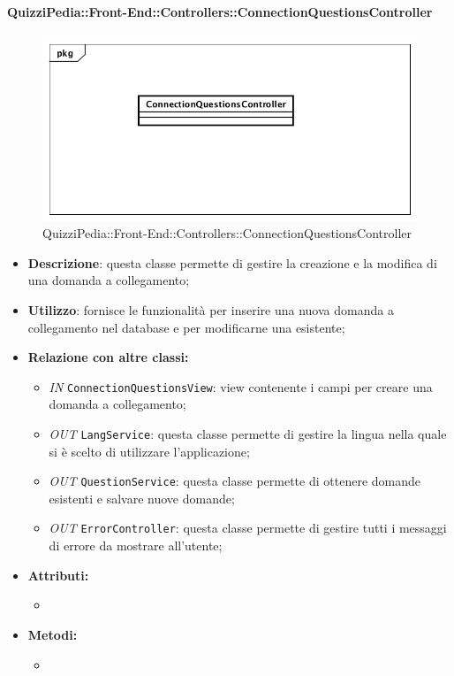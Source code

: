 \paragraph{QuizziPedia::Front-End::Controllers::ConnectionQuestionsController}
\begin{figure}
	\centering
	\includegraphics[scale=0.45]{UML/Classi/Front-End/QuizziPedia_Front-end_Controller_ConnectionQuestionsController.png}
	\caption{QuizziPedia::Front-End::Controllers::ConnectionQuestionsController}
\end{figure}
\begin{itemize}
	\item \textbf{Descrizione}: questa classe permette di gestire la creazione e la modifica di una domanda a collegamento;
	\item \textbf{Utilizzo}: fornisce le funzionalità per inserire una nuova domanda a collegamento nel database e per modificarne una esistente;
	\item \textbf{Relazione con altre classi:}
	\begin{itemize}
		\item \textit{IN} \texttt{ConnectionQuestionsView}: view contenente i campi per creare una domanda a collegamento;  
		\item \textit{OUT} \texttt{LangService}: questa classe permette di gestire la lingua nella quale si è scelto di utilizzare l'applicazione;
		\item \textit{OUT} \texttt{QuestionService}: questa classe permette di ottenere domande esistenti e salvare nuove domande;
		\item \textit{OUT} \texttt{ErrorController}: questa classe permette di gestire tutti i messaggi di errore da mostrare all'utente;
	\end{itemize}
	\item \textbf{Attributi:}
	\begin{itemize}
		\item 
	\end{itemize}
	\item \textbf{Metodi:}
	\begin{itemize}
		\item 
	\end{itemize}
\end{itemize}

